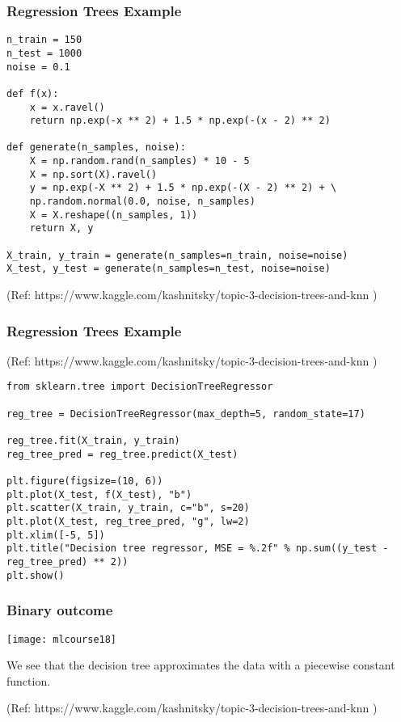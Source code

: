 \begin{frame}[fragile]\frametitle{Regression Trees Example}
\begin{lstlisting}
n_train = 150        
n_test = 1000       
noise = 0.1

def f(x):
    x = x.ravel()
    return np.exp(-x ** 2) + 1.5 * np.exp(-(x - 2) ** 2)

def generate(n_samples, noise):
    X = np.random.rand(n_samples) * 10 - 5
    X = np.sort(X).ravel()
    y = np.exp(-X ** 2) + 1.5 * np.exp(-(X - 2) ** 2) + \
    np.random.normal(0.0, noise, n_samples)
    X = X.reshape((n_samples, 1))
    return X, y

X_train, y_train = generate(n_samples=n_train, noise=noise)
X_test, y_test = generate(n_samples=n_test, noise=noise)
\end{lstlisting}

{\tiny (Ref: https://www.kaggle.com/kashnitsky/topic-3-decision-trees-and-knn )}

\end{frame}

\begin{frame}[fragile]\frametitle{Regression Trees Example}

{\tiny (Ref: https://www.kaggle.com/kashnitsky/topic-3-decision-trees-and-knn )}

\begin{lstlisting}
from sklearn.tree import DecisionTreeRegressor

reg_tree = DecisionTreeRegressor(max_depth=5, random_state=17)

reg_tree.fit(X_train, y_train)
reg_tree_pred = reg_tree.predict(X_test)

plt.figure(figsize=(10, 6))
plt.plot(X_test, f(X_test), "b")
plt.scatter(X_train, y_train, c="b", s=20)
plt.plot(X_test, reg_tree_pred, "g", lw=2)
plt.xlim([-5, 5])
plt.title("Decision tree regressor, MSE = %.2f" % np.sum((y_test - reg_tree_pred) ** 2))
plt.show()
\end{lstlisting}


\end{frame}


\begin{frame}[fragile]\frametitle{Binary outcome}
\begin{center}
\texttt{[image: mlcourse18]}
\end{center}

We see that the decision tree approximates the data with a piecewise constant function.

{\tiny (Ref: https://www.kaggle.com/kashnitsky/topic-3-decision-trees-and-knn )}

\end{frame}





